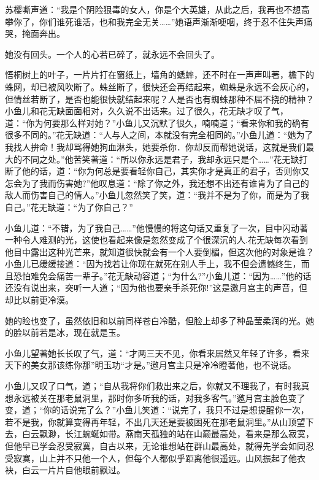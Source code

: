 \documentclass[12pt,oneside]{book}
\begin{document}
苏樱嘶声道：``我是个阴险狠毒的女人，你是个大英雄，从此之后，我再也不想高攀你了，你们谁死谁活，也和我完全无关\ldots\ldots{}''她语声渐渐哽咽，终于忍不住失声痛哭，掩面奔出。

她没有回头。一个人的心若已碎了，就永远不会回头了。

悟桐树上的叶子，一片片打在窗纸上，墙角的蟋蟀，还不时在一声声叫著，檐下的蛛网，却已被风吹断了。蛛丝断了，很快还会再结起来，蜘蛛是永远不会灰心的，但情丝若断了，是否也能很快就结起来呢？人是否也有蜘蛛那种不屈不挠的精神？小鱼儿和花无缺面面相对，久久说不出话来。过了很久，花无缺才叹了气，道：``你为何要那么样对她？''小鱼儿又沉默了很久，喃喃道；``看来你和我的确有很多不同的。''花无缺道：``人与人之间，本就没有完全相同的。''小鱼儿道：``她为了我找人拚命！我却骂得她狗血淋头，她要杀你．你却反而帮她说话，这就是我们最大的不同之处。''他苦笑著道：``所以你永远是君子，我却永远只是个\ldots\ldots{}''花无缺打断了他的话，道：``你为何总是要看轻你自己，其实你才是真正的君子，否则你又怎会为了我而伤害她?''他叹息道：``除了你之外，我还想不出还有谁肯为了自己的敌人而伤害自己的情人。''小鱼儿忽然笑了笑，道：``我并不是为了你，而是为了我自己。''花无缺道：``为了你自己？''

小鱼儿道：``不错，为了我自己\ldots\ldots{}''他慢慢的将这句话又重复了一次，目中闪动著一种令人难测的光，这使也看起来像是忽然变成了个很深沉的人.花无缺每次看到他目中露出这种光芒来，就知道很快就会有一个人要倒楣，但这次他的对象是谁？小鱼儿已缓缓接道：``因为找若让你现在就死在别人手上，我不但会遗憾终生，而且恐怕难免会痛苦一辈子。''花无缺动容道；``为什么?''小鱼儿道：``因为\ldots\ldots{}''他的话还没有说出来，突听一人道；``因为他也要亲手杀死你!''这是邀月宫主的声音，但却比以前更冷漠。

她的睑也变了，虽然依旧和以前同样苍白冷酷，但脸上却多了种晶莹柔润的光。她的脸以前若是冰，现在就是玉。

小鱼儿望著她长长叹了气，道：``才两三天不见，你看来居然又年轻了许多，看来天下的美女那该练你那''明玉功``才是。''邀月宫主只是冷冷瞪著他，也不说话。

小鱼儿又叹了口气，道；``自从我将你们救出来之后，你就又不理我了，有时我真想永远被关在那老鼠洞里，那时你多听我的话，对我多客气。''邀月宫主脸色变了变，道；``你的话说完了么？''小鱼儿笑道：``说完了，我只不过是想提醒你一次，若不是我，你就算变得再年轻，不出几天还是要被困死在那老鼠洞里。''从山顶望下去，白云飘渺，长江蜿蜒如带。燕南天孤独的站在山巅最高处，看来是那么寂寞，但他早已学会忍受寂寞，自古以来，无论谁想站在群山最高处，就得先学会如同忍受寂寞，山上并不只他一个人，但每个人都似乎距离他很遥远。山风振起了他衣袂，白云一片片自他眼前飘过。
\end{document}
